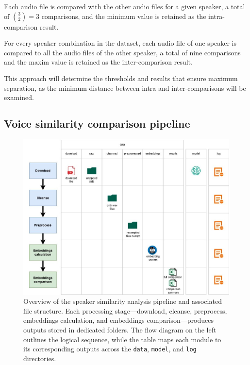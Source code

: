 \documentclass[conference]{IEEEtran}
\begin{document}
Each audio file is compared with the other audio files for a given speaker, a total of $\binom{3}{2} = 3$ comparisons, and the minimum value is retained as the intra-comparison result.

For every speaker combination in the dataset, each audio file of one speaker is compared to all the audio files of the other speaker, a total of nine comparisons and the maxim value is retained as the inter-comparison result.

This approach will determine the thresholds and results that ensure maximum separation, as the minimum distance between intra and inter-comparisons will be examined.



\subsection{Voice similarity comparison pipeline}

\begin{figure}[H]
	\centering
	\includegraphics[width=1\linewidth]{img/img-pipeline}
	\caption{Overview of the speaker similarity analysis pipeline and associated file structure. Each processing stage—download, cleanse, preprocess, embeddings calculation, and embeddings comparison—produces outputs stored in dedicated folders. The flow diagram on the left outlines the logical sequence, while the table maps each module to its corresponding outputs across the \texttt{data}, \texttt{model}, and \texttt{log} directories.}
	
	\label{fig:img-pipeline}
\end{figure}
\end{document}
